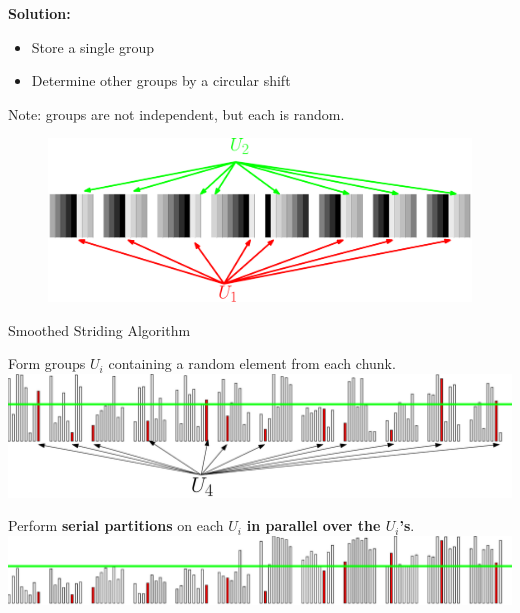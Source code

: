 \documentclass[xcolor=x11names, svgnames, rgb]{beamer}
\begin{document}
\begin{frame}[t]{}
  \textbf{Solution:}
  \begin{itemize}
    \item Store a single group
    \item Determine other groups by a circular shift
  \end{itemize}

Note: groups are not independent, but each is random.

\vspace{0.5cm}
\begin{figure} \includegraphics[width=\linewidth]{imgs/blackrainbowAlt.eps} \end{figure}	
\end{frame}

\begin{frame}[t]{Smoothed Striding Algorithm}

  {\color{blue}Form groups $U_i$ containing a random element from
  each chunk.}
  \includegraphics[width=\linewidth]{imgs/smoothedStridingAlgSim/sim2.eps}
  
  \vspace{0.5cm}
  {\color{blue}Perform \textbf{serial partitions} on each $U_i$ \textbf{in parallel over the $U_i$'s}.}
  \includegraphics[width=\linewidth]{imgs/smoothedStridingAlgSim/sim3.eps}
\end{frame}
\end{document}
